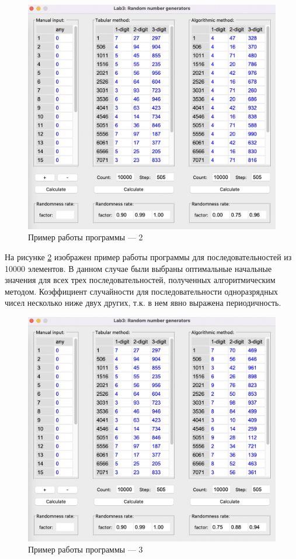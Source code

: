\documentclass[12pt]{report}
\begin{document}
\begin{figure}[h!btp]
	\centering
	\includegraphics[width=1\textwidth]{inc/pic2.png}
	\caption{Пример работы программы --- 2}
	\label{fig:pic2}	
\end{figure}
\clearpage

На рисунке \ref{fig:pic3} изображен пример работы программы для последовательностей из 10000 элементов.
В данном случае были выбраны оптимальные начальные значения для всех трех последовательностей, полученных алгоритмическим методом. Коэффициент случайности для последовательности одноразрядных чисел несколько ниже двух других, т.к. в нем явно выражена периодичность.

\begin{figure}[h!btp]
	\centering
	\includegraphics[width=1\textwidth]{inc/pic3.png}
	\caption{Пример работы программы --- 3}
	\label{fig:pic3}	
\end{figure}
\end{document}
